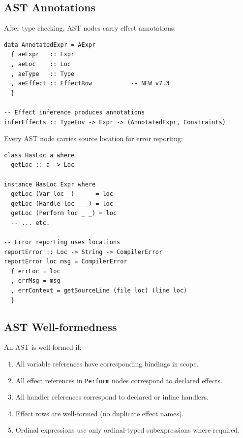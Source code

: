 \subsection{AST Annotations}
\label{subsec:ast-annotations}

\begin{definition}
\label{def:effect-annotations}
After type checking, AST nodes carry effect annotations:
\begin{verbatim}
data AnnotatedExpr = AExpr
  { aeExpr   :: Expr
  , aeLoc    :: Loc
  , aeType   :: Type
  , aeEffect :: EffectRow           -- NEW v7.3
  }

-- Effect inference produces annotations
inferEffects :: TypeEnv -> Expr -> (AnnotatedExpr, Constraints)
\end{verbatim}
\end{definition}

\begin{definition}
\label{def:source-loc}
Every AST node carries source location for error reporting:
\begin{verbatim}
class HasLoc a where
  getLoc :: a -> Loc

instance HasLoc Expr where
  getLoc (Var loc _)      = loc
  getLoc (Handle loc _ _) = loc
  getLoc (Perform loc _ _) = loc
  -- ... etc.

-- Error reporting uses locations
reportError :: Loc -> String -> CompilerError
reportError loc msg = CompilerError
  { errLoc = loc
  , errMsg = msg
  , errContext = getSourceLine (file loc) (line loc)
  }
\end{verbatim}
\end{definition}

\subsection{AST Well-formedness}
\label{subsec:ast-wellformed}

\begin{definition}
\label{def:ast-wellformed}
An AST is well-formed if:
\begin{enumerate}
  \item All variable references have corresponding bindings in scope.
  \item All effect references in \texttt{Perform} nodes correspond to declared effects.
  \item All handler references correspond to declared or inline handlers.
  \item Effect rows are well-formed (no duplicate effect names).
  \item Ordinal expressions use only ordinal-typed subexpressions where required.
\end{enumerate}
\end{definition}


